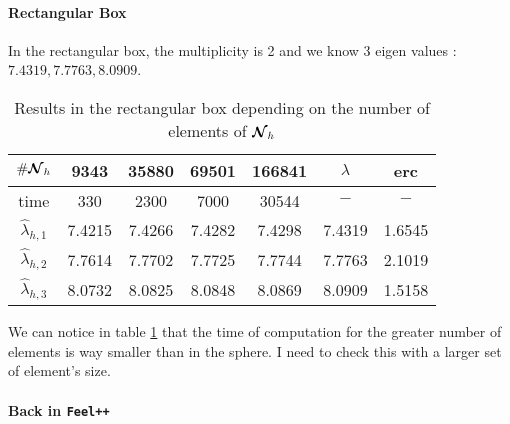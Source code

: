 \paragraph{Rectangular Box}

In the rectangular box, the multiplicity is 2 and we know 3 eigen values : $7.4319, 7.7763, 8.0909$.
\begin{table}[H]
  \centering
  \begin{tabular}{c|cccc|c|c}
    $\#{\bm{\mathcal{N}}}_h$ & 9343 & 35880 & 69501 & 166841 & $\lambda$ & erc \\
    \hline
    time & 330 & 2300 & 7000 & 30544 & $-$ & $-$ \\
    \hline
    $\widehat{\lambda}_{h,1}$ & 7.4215 & 7.4266 & 7.4282 & 7.4298 & 7.4319 & 1.6545 \\
    $\widehat{\lambda}_{h,2}$ & 7.7614 & 7.7702 & 7.7725 & 7.7744 & 7.7763 & 2.1019 \\
    $\widehat{\lambda}_{h,3}$ & 8.0732 & 8.0825 & 8.0848 & 8.0869 & 8.0909 & 1.5158
  \end{tabular}
  \caption{Results in the rectangular box depending on the number of elements of ${\bm{\mathcal{N}}}_h$}
  \label{RBResults}
\end{table}
We can notice in table \ref{RBResults} that the time of computation for the greater number of elements is way smaller than in the sphere. I need to check this with a larger set of element's size.

\paragraph{Back in \texttt{Feel++}}

